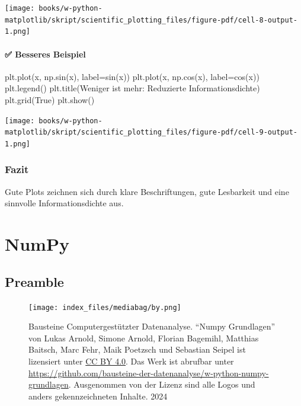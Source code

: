 \documentclass[
  letterpaper,
  DIV=11,
  numbers=noendperiod]{scrreprt}
\newenvironment{Shaded}{\begin{snugshade}}{\end{snugshade}}
\newcommand{\NormalTok}[1]{\textcolor[rgb]{0.00,0.23,0.31}{#1}}
\newcommand{\OperatorTok}[1]{\textcolor[rgb]{0.37,0.37,0.37}{#1}}
\newcommand{\StringTok}[1]{\textcolor[rgb]{0.13,0.47,0.30}{#1}}
\newcommand{\VariableTok}[1]{\textcolor[rgb]{0.07,0.07,0.07}{#1}}
\begin{document}
\texttt{[image: books/w-python-matplotlib/skript/scientific\_plotting\_files/figure-pdf/cell-8-output-1.png]}

\subsection{✅ Besseres Beispiel}\label{besseres-beispiel-3}

\begin{Shaded}
\begin{Highlighting}[]
\NormalTok{plt.plot(x, np.sin(x), label}\OperatorTok{=}\StringTok{\textquotesingle{}sin(x)\textquotesingle{}}\NormalTok{)}
\NormalTok{plt.plot(x, np.cos(x), label}\OperatorTok{=}\StringTok{\textquotesingle{}cos(x)\textquotesingle{}}\NormalTok{)}
\NormalTok{plt.legend()}
\NormalTok{plt.title(}\StringTok{\textquotesingle{}Weniger ist mehr: Reduzierte Informationsdichte\textquotesingle{}}\NormalTok{)}
\NormalTok{plt.grid(}\VariableTok{True}\NormalTok{)}
\NormalTok{plt.show()}
\end{Highlighting}
\end{Shaded}

\texttt{[image: books/w-python-matplotlib/skript/scientific\_plotting\_files/figure-pdf/cell-9-output-1.png]}

\section{Fazit}\label{fazit-3}

Gute Plots zeichnen sich durch klare Beschriftungen, gute Lesbarkeit und
eine sinnvolle Informationsdichte aus.

\part{NumPy}

\chapter*{Preamble}\label{preamble-1}


\label{Lizenz}
\begin{figure}

\begin{minipage}{0.20\linewidth}
\texttt{[image: index\_files/mediabag/by.png]}\end{minipage}%
%
\begin{minipage}{0.80\linewidth}
Bausteine Computergestützter Datenanalyse. ``Numpy Grundlagen'' von
Lukas Arnold, Simone Arnold, Florian Bagemihl, Matthias Baitsch, Marc
Fehr, Maik Poetzsch und Sebastian Seipel ist lizensiert unter
\href{https://creativecommons.org/licenses/by/4.0/deed.de}{CC BY 4.0}.
Das Werk ist abrufbar unter
\url{https://github.com/bausteine-der-datenanalyse/w-python-numpy-grundlagen}.
Ausgenommen von der Lizenz sind alle Logos und anders gekennzeichneten
Inhalte. 2024\end{minipage}%

\end{figure}%
\end{document}
